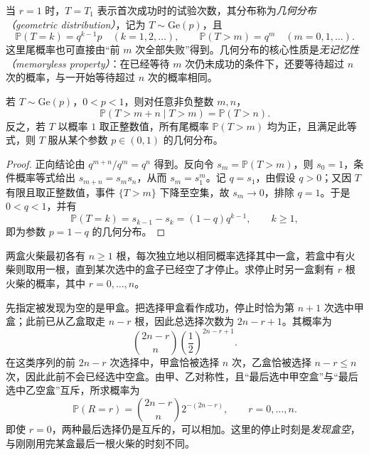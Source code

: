 当 $r=1$ 时，$T=T_1$ 表示首次成功时的试验次数，其分布称为\emph{几何分布（geometric distribution）}，记为 $T\sim\mathrm{Ge}(p)$，且
\begin{equation}
  \mathbb P(T=k)=q^{k-1}p\quad(k=1,2,\ldots),\qquad
  \mathbb P(T>m)=q^m\quad(m=0,1,\ldots).
  \label{eq:study-geometric-mass-tail}
\end{equation}
这里尾概率也可直接由“前 $m$ 次全部失败”得到。几何分布的核心性质是\emph{无记忆性（memoryless property）}：在已经等待 $m$ 次仍未成功的条件下，还要等待超过 $n$ 次的概率，与一开始等待超过 $n$ 次的概率相同。

\begin{theorem}[几何分布的无记忆性及刻画]
\label{thm:study-geometric-memoryless}
若 $T\sim\mathrm{Ge}(p)$，$0<p<1$，则对任意非负整数 $m,n$，
\begin{equation}
  \mathbb P(T>m+n\mid T>m)=\mathbb P(T>n).
  \label{eq:study-geometric-memoryless}
\end{equation}
反之，若 $T$ 以概率 $1$ 取正整数值，所有尾概率 $\mathbb P(T>m)$ 均为正，且满足此等式，则 $T$ 服从某个参数 $p\in(0,1)$ 的几何分布。
\end{theorem}

\begin{proof}
正向结论由 $q^{m+n}/q^m=q^n$ 得到。反向令 $s_m=\mathbb P(T>m)$，则 $s_0=1$，条件概率等式给出 $s_{m+n}=s_ms_n$，从而 $s_m=s_1^m$。记 $q=s_1$，由假设 $q>0$；又因 $T$ 有限且取正整数值，事件 $\{T>m\}$ 下降至空集，故 $s_m\to0$，排除 $q=1$。于是 $0<q<1$，并有
\[
  \mathbb P(T=k)=s_{k-1}-s_k=(1-q)q^{k-1},\qquad k\ge1,
\]
即为参数 $p=1-q$ 的几何分布。
\end{proof}

\begin{example}
\label{ex:study-banach-matches}
两盒火柴最初各有 $n\ge1$ 根，每次独立地以相同概率选择其中一盒，若盒中有火柴则取用一根，直到某次选中的盒子已经空了才停止。求停止时另一盒剩有 $r$ 根火柴的概率，其中 $r=0,\ldots,n$。
\end{example}

\begin{solve}
先指定被发现为空的是甲盒。把选择甲盒看作成功，停止时恰为第 $n+1$ 次选中甲盒；此前已从乙盒取走 $n-r$ 根，因此总选择次数为 $2n-r+1$。其概率为
\[
  \binom{2n-r}{n}\left(\frac12\right)^{2n-r+1}.
\]
在这类序列的前 $2n-r$ 次选择中，甲盒恰被选择 $n$ 次，乙盒恰被选择 $n-r\le n$ 次，因此此前不会已经选中空盒。由甲、乙对称性，且“最后选中甲空盒”与“最后选中乙空盒”互斥，所求概率为
\begin{equation}
  \mathbb P(R=r)=\binom{2n-r}{n}2^{-(2n-r)},
  \qquad r=0,\ldots,n.
  \label{eq:study-banach-matches}
\end{equation}
即使 $r=0$，两种最后选择仍是互斥的，可以相加。这里的停止时刻是\emph{发现盒空}，与刚刚用完某盒最后一根火柴的时刻不同。
\end{solve}

